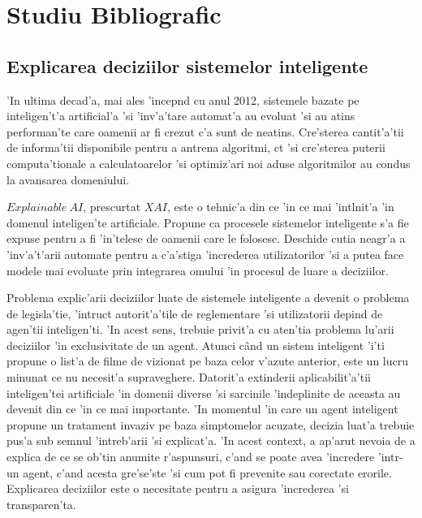 \documentclass[12pt,a4paper,twoside]{report}
\begin{document}
\chapter{Studiu Bibliografic}

\section{Explicarea deciziilor sistemelor inteligente}
'In ultima decad'a, mai ales 'incep\ia nd cu anul 2012, sistemele bazate pe inteligen't'a artificial'a 'si 'inv'a'tare automat'a au evoluat 'si au atins performan'te care oamenii ar fi crezut c'a sunt de neatins. Cre'sterea cantit'a'tii de informa'tii disponibile pentru a antrena algoritmi, c\ia t 'si cre'sterea puterii computa'tionale a calculatoarelor 'si optimiz'ari noi aduse algoritmilor au condus la avansarea domeniului.

$Explainable\ AI$, prescurtat $XAI$, este o tehnic'a din ce 'in ce mai 'int\ia lnit'a 'in domenul inteligen'te artificiale. Propune ca procesele sistemelor inteligente s'a fie expuse pentru a fi 'in'telese de oamenii care le folosesc. Deschide cutia neagr'a a 'inv'a't'arii automate pentru a c'a'stiga 'increderea utilizatorilor 'si a putea face modele mai evoluate prin integrarea omului 'in procesul de luare a deciziilor. 

Problema explic'arii deciziilor luate de sistemele inteligente a devenit o problema de legisla'tie, 'intruc\ia t autorit'a'tile de reglementare 'si utilizatorii depind de agen'tii inteligen'ti. 'In acest sens, trebuie privit'a cu aten'tia problema lu'arii deciziilor 'in exclusivitate de un agent. Atunci c\^and un sistem inteligent 'i'ti propune o list'a de filme de vizionat pe baza celor v'azute anterior, este un lucru minunat ce nu necesit'a supraveghere. Datorit'a extinderii aplicabilit'a'tii inteligen'tei artificiale 'in domenii diverse 'si sarcinile 'indeplinite de aceasta au devenit din ce 'in ce mai importante. 'In momentul 'in care un agent inteligent propune un tratament invaziv pe baza simptomelor acuzate, decizia luat'a trebuie pus'a sub semnul 'intreb'arii 'si explicat'a. 'In acest context, a ap'arut nevoia de a explica de ce se ob'tin anumite r'aspunsuri, c'and se poate avea 'incredere 'intr-un agent, c'and acesta gre'se'ste 'si cum pot fi prevenite sau corectate erorile. Explicarea deciziilor este o necesitate pentru a asigura 'increderea 'si transparen'ta.
\end{document}
